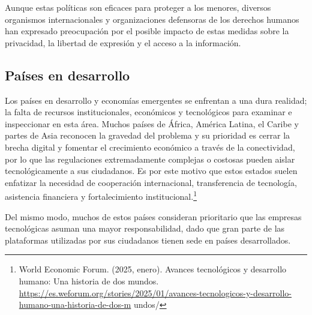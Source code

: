 Aunque estas políticas son eficaces para proteger a los menores, diversos organismos internacionales y organizaciones defensoras de los derechos humanos han expresado preocupación por el posible impacto de estas medidas sobre la privacidad, la libertad de expresión y el acceso a la información.

\subsection{Países en desarrollo}

Los países en desarrollo y economías emergentes se enfrentan a una dura realidad; la falta de recursos institucionales, económicos y tecnológicos para examinar e inspeccionar en esta área. Muchos países de África, América Latina, el Caribe y partes de Asia reconocen la gravedad del problema y su prioridad es cerrar la brecha digital y fomentar el crecimiento económico a través de la conectividad, por lo que las regulaciones extremadamente complejas o costosas pueden aislar tecnológicamente a sus ciudadanos. Es por este motivo que estos estados suelen enfatizar la necesidad de cooperación internacional, transferencia de tecnología, asistencia financiera y fortalecimiento institucional.\footnote{World Economic Forum. (2025, enero). Avances tecnológicos y desarrollo humano: Una historia de dos mundos. \url{https://es.weforum.org/stories/2025/01/avances-tecnologicos-y-desarrollo-humano-una-historia-de-dos-m} undos/}

Del mismo modo, muchos de estos países consideran prioritario que las empresas tecnológicas asuman una mayor responsabilidad, dado que gran parte de las plataformas utilizadas por sus ciudadanos tienen sede en países desarrollados.

